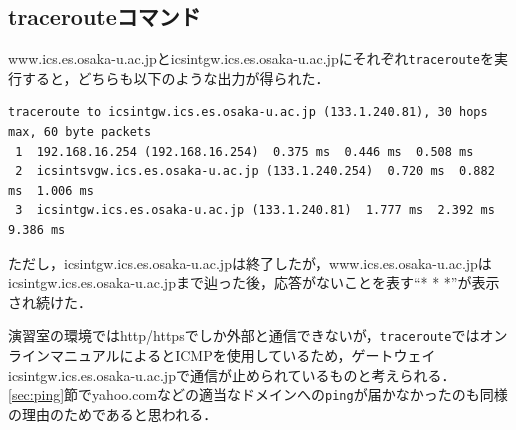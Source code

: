 \documentclass[a4j,10pt,titlepage]{jsarticle}
\begin{document}
\subsection{tracerouteコマンド}\label{sec:traceroute}
www.ics.es.osaka-u.ac.jpとicsintgw.ics.es.osaka-u.ac.jpにそれぞれ\verb|traceroute|を実行すると，どちらも以下のような出力が得られた．
\begin{verbatim}
traceroute to icsintgw.ics.es.osaka-u.ac.jp (133.1.240.81), 30 hops max, 60 byte packets
 1  192.168.16.254 (192.168.16.254)  0.375 ms  0.446 ms  0.508 ms
 2  icsintsvgw.ics.es.osaka-u.ac.jp (133.1.240.254)  0.720 ms  0.882 ms  1.006 ms
 3  icsintgw.ics.es.osaka-u.ac.jp (133.1.240.81)  1.777 ms  2.392 ms  9.386 ms
\end{verbatim}

ただし，icsintgw.ics.es.osaka-u.ac.jpは終了したが，www.ics.es.osaka-u.ac.jpはicsintgw.ics.es.osaka-u.ac.jpまで辿った後，応答がないことを表す``* * *''が表示され続けた．

演習室の環境ではhttp/httpsでしか外部と通信できないが，\verb|traceroute|ではオンラインマニュアルによるとICMPを使用しているため，ゲートウェイicsintgw.ics.es.osaka-u.ac.jpで通信が止められているものと考えられる．
\ref{sec:ping}節でyahoo.comなどの適当なドメインへの\verb|ping|が届かなかったのも同様の理由のためであると思われる．
\end{document}
